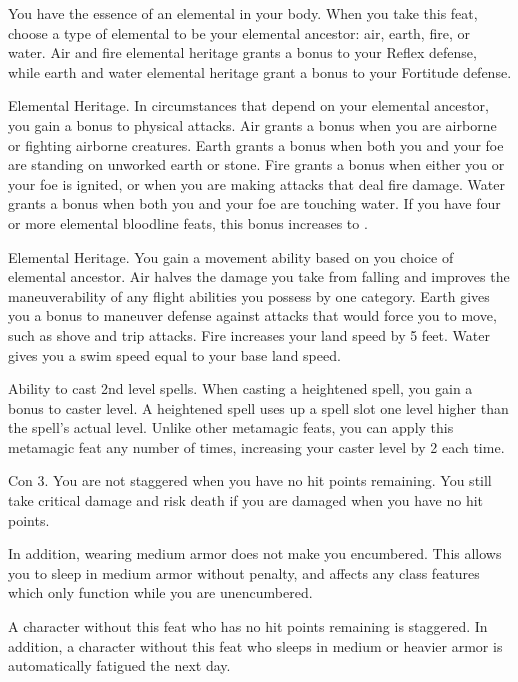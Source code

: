 \featben You have the essence of an elemental in your body.
When you take this feat, choose a type of elemental to be your elemental ancestor: air, earth, fire, or water.
Air and fire elemental heritage grants a  bonus to your Reflex defense, while earth and water elemental heritage grant a  bonus to your Fortitude defense.

\featpre Elemental Heritage.
\featben In circumstances that depend on your elemental ancestor, you gain a  bonus to physical attacks.
Air grants a bonus when you are airborne or fighting airborne creatures.
Earth grants a bonus when both you and your foe are standing on unworked earth or stone.
Fire grants a bonus when either you or your foe is ignited, or when you are making attacks that deal fire damage.
Water grants a bonus when both you and your foe are touching water.
If you have four or more elemental bloodline feats, this bonus increases to .

\featpre Elemental Heritage.
\featben You gain a movement ability based on you choice of elemental ancestor.
Air halves the damage you take from falling and improves the maneuverability of any flight abilities you possess by one category.
Earth gives you a  bonus to maneuver defense against attacks that would force you to move, such as shove and trip attacks.
Fire increases your land speed by 5 feet.
Water gives you a swim speed equal to your base land speed.

\featpre Ability to cast 2nd level spells.
\featben When casting a heightened spell, you gain a  bonus to caster level.
A heightened spell uses up a spell slot one level higher than the spell's actual level.
Unlike other metamagic feats, you can apply this metamagic feat any number of times, increasing your caster level by 2 each time.

\featpre Con 3.
\featben You are not staggered when you have no hit points remaining.
You still take critical damage and risk death if you are damaged when you have no hit points.

In addition, wearing medium armor does not make you encumbered.
This allows you to sleep in medium armor without penalty, and affects any class features which only function while you are unencumbered.

A character without this feat who has no hit points remaining is staggered.
In addition, a character without this feat who sleeps in medium or heavier armor is automatically fatigued the next day.

